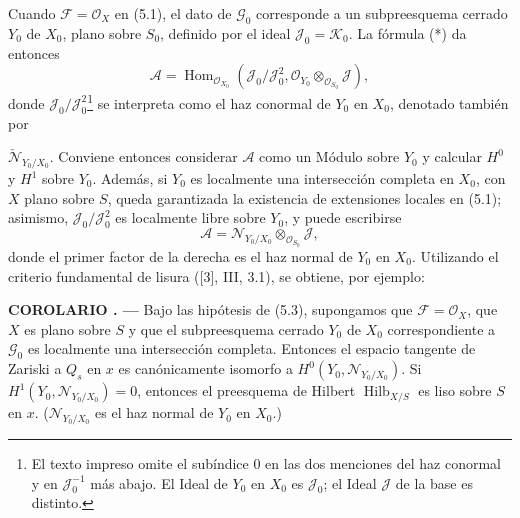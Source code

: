 \documentclass[11pt,twoside,openany]{book}
\numberwithin{equation}{section}
\newcommand{\src}[1]{%
  \phantomsection\hypertarget{src:#1}{}%
  \marginpar{\raggedleft\footnotesize\sffamily #1}%
}
\theoremstyle{plain}
\theoremstyle{definition}
\theoremstyle{remark}
\newcommand{\result}[2]{%
  \par\medskip\noindent\textbf{#1%
  \if\relax\detokenize{#2}\relax\else\space#2\fi. ---}\enspace
}
\newcommand{\FgaUnitKey}{frontmatter}
\renewcommand{\src}[1]{%
  \phantomsection\hypertarget{src:\FgaUnitKey:#1}{}%
  \marginpar{\raggedleft\footnotesize\sffamily #1}%
}
\theoremstyle{plain}
\theoremstyle{definition}
\theoremstyle{remark}
\begin{document}
Cuando $\mathcal F=\mathcal O_X$ en (5.1), el dato de $\mathcal G_0$
corresponde a un subpreesquema cerrado $Y_0$ de $X_0$, plano sobre $S_0$,
definido por el ideal $\mathcal J_0=\mathcal K_0$. La fórmula (*) da entonces
\[
\mathcal A=\operatorname{Hom}_{\mathcal O_{X_0}}
(\mathcal J_0/\mathcal J_0^2,
\mathcal O_{Y_0}\otimes_{\mathcal O_{S_0}}\mathcal J),
\]
donde $\mathcal J_0/\mathcal J_0^2$\footnote{El texto impreso omite el subíndice $0$ en las dos menciones del haz conormal y en $\mathcal J_0^{-1}$ más abajo. El Ideal de $Y_0$ en $X_0$ es $\mathcal J_0$; el Ideal $\mathcal J$ de la base es distinto.} se interpreta como el haz conormal de $Y_0$
en $X_0$, denotado también por
\src{271}
$\check{\mathcal N}_{Y_0/X_0}$. Conviene entonces considerar $\mathcal A$
como un Módulo sobre $Y_0$ y calcular $H^0$ y $H^1$ sobre $Y_0$. Además, si
$Y_0$ es localmente una intersección completa en $X_0$, con $X$ plano sobre
$S$, queda garantizada la existencia de extensiones locales en (5.1); asimismo,
$\mathcal J_0/\mathcal J_0^2$ es localmente libre sobre $Y_0$, y puede escribirse
\[
\mathcal A=\mathcal N_{Y_0/X_0}\otimes_{\mathcal O_{S_0}}\mathcal J,
\]
donde el primer factor de la derecha es el haz normal de $Y_0$ en $X_0$.
Utilizando el criterio fundamental de lisura ([3], III, 3.1), se obtiene, por
ejemplo:

\result{COROLARIO}{5.4} Bajo las hipótesis de (5.3), supongamos que
$\mathcal F=\mathcal O_X$, que $X$ es plano sobre $S$ y que el subpreesquema
cerrado $Y_0$ de $X_0$ correspondiente a $\mathcal G_0$ es localmente una
intersección completa. Entonces el espacio tangente de Zariski a $Q_s$ en $x$
es canónicamente isomorfo a $H^0(Y_0,\mathcal N_{Y_0/X_0})$. Si
$H^1(Y_0,\mathcal N_{Y_0/X_0})=0$, entonces el preesquema de Hilbert
$\operatorname{Hilb}_{X/S}$ es liso sobre $S$ en $x$.
($\mathcal N_{Y_0/X_0}$ es el haz normal de $Y_0$ en $X_0$.)
\end{document}
